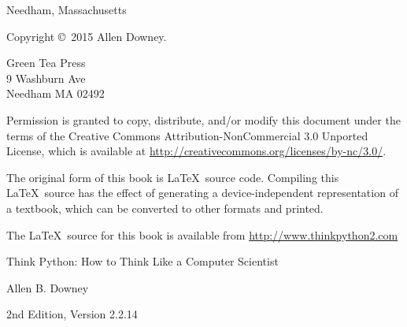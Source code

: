 \documentclass[10pt,b5paper]{ctexbook} %
\newcommand{\thetitle}{Think Python: How to Think Like a Computer Scientist}
\newcommand{\theversion}{2nd Edition, Version 2.2.14}
\newcommand{\thedate}{}
\begin{document}
\begin{latexonly}
\begin{flushright}
{\small Needham, Massachusetts}

\vfill

\end{flushright}


\pagebreak
\thispagestyle{empty}

{\small
Copyright \copyright ~2015 Allen Downey.


\vspace{0.2in}

\begin{flushleft}
Green Tea Press       \\
9 Washburn Ave        \\
Needham MA 02492
\end{flushleft}

Permission is granted to copy, distribute, and/or modify this document
under the terms of the Creative Commons Attribution-NonCommercial 3.0 Unported
License, which is available at \url{http://creativecommons.org/licenses/by-nc/3.0/}.

The original form of this book is \LaTeX\ source code.  Compiling this
\LaTeX\ source has the effect of generating a device-independent
representation of a textbook, which can be converted to other formats
and printed.

The \LaTeX\ source for this book is available from
\url{http://www.thinkpython2.com}

\vspace{0.2in}

} %

\end{latexonly}



\begin{htmlonly}


{\Large \thetitle}

{\large Allen B. Downey}

\theversion

\thedate

\setcounter{chapter}{-1}

\end{htmlonly}

\fi



\mainmatter


\end{document}
